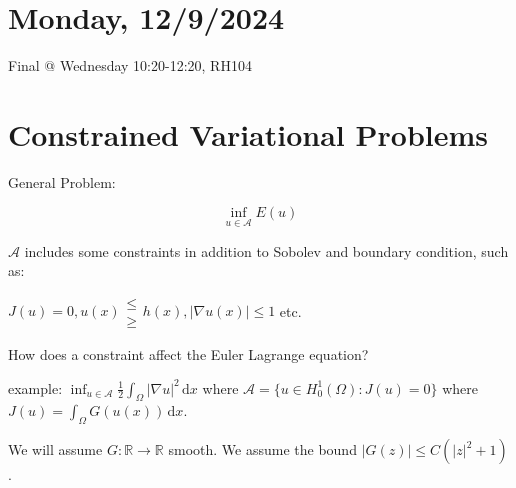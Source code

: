 \documentclass{article}
\theoremstyle{definition}
\begin{document}
\section*{Monday, 12/9/2024}

Final @ Wednesday 10:20-12:20, RH104

\section*{Constrained Variational Problems}

General Problem:

\[
    \inf_{u\in \mathcal{A}} E(u)
\]

\(\mathcal{A}\) includes some constraints in addition to Sobolev and boundary condition, such as:

\(J(u) = 0, u(x) \substack{\leq \\ \geq} h(x), \vert \nabla u(x) \vert \leq 1\) etc.

How does a constraint affect the Euler Lagrange equation?

example: \(\inf_{u\in \mathcal{A}} \frac{1}{2} \int_{\Omega} \vert \nabla u \vert ^ 2 \,\mathrm{d}x \) where \(\mathcal{A} = \{ u \in H^1_0(\Omega) : J(u) = 0 \} \) where \(J(u) =  \int_{\Omega} G(u(x)) \,\mathrm{d}x \).

We will assume \(G:\mathbb{R} \to \mathbb{R}\) smooth. We assume the bound \(\vert G(z) \vert \leq C(\vert z \vert ^ 2 + 1)\).
\end{document}
